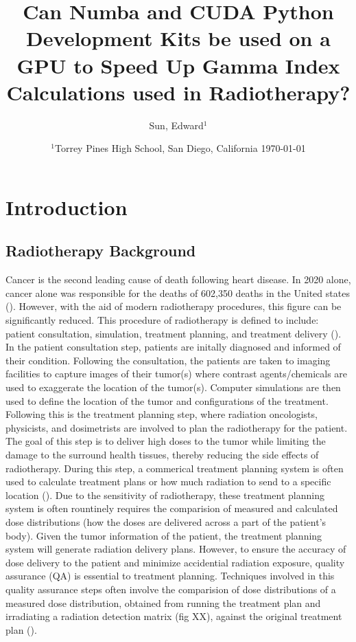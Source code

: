 \documentclass[12pt]{article}
\title{Can Numba and CUDA Python Development Kits be used on a GPU to Speed Up Gamma Index Calculations used in Radiotherapy?}
\author{
  Sun, Edward$^{1}$
}
\date{%
  $^{1}$Torrey Pines High School, San Diego, California
  \today
}
\begin{document}
\maketitle
\section{Introduction}
\subsection{Radiotherapy Background}
Cancer is the second leading cause of death following heart disease. In 2020 alone, cancer alone was responsible for the deaths of 602,350 deaths in the United states (\textcite{CDC}). However, with the aid of modern radiotherapy procedures, this figure can be significantly reduced. This procedure of radiotherapy is defined to include: patient consultation, simulation, treatment planning, and treatment delivery (\textcite{SBU}). In the patient consultation step, patients are initally diagnosed and informed of their condition. Following the consultation, the patients are taken to imaging facilities to capture images of their tumor(s) where contrast agents/chemicals are used to exaggerate the location of the tumor(s). Computer simulations are then used to define the location of the tumor and configurations of the treatment. Following this is the treatment planning step, where radiation oncologists, physicists, and dosimetrists are involved to plan the radiotherapy for the patient. The goal of this step is to deliver high doses to the tumor while limiting the damage to the surround health tissues, thereby reducing the side effects of radiotherapy. During this step, a commerical treatment planning system is often used to calculate treatment plans or how much radiation to send to a specific location (\textcite{Gardner}). Due to the sensitivity of radiotherapy, these treatment planning system is often rountinely requires the comparision of measured and calculated dose distributions (how the doses are delivered across a part of the patient's body). Given the tumor information of the patient, the treatment planning system will generate radiation delivery plans. However, to ensure the accuracy of dose delivery to the patient and minimize accidential radiation exposure, quality assurance (QA) is essential to treatment planning. Techniques involved in this quality assurance steps often involve the comparision of dose distributions of a measured dose distribution, obtained from running the treatment plan and irradiating a radiation detection matrix (fig XX), against the original treatment plan (\textcite{Low}).
\end{document}
